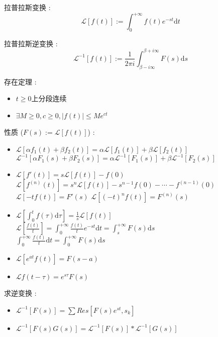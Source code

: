 \documentclass[UTF8, 12pt]{ctexart}
\begin{document}
	
	拉普拉斯变换 : \[ \mathscr{L}[f(t)] := \int_{0}^{+\infty}f(t)e^{-st}\mathrm{d}t \]	

	拉普拉斯逆变换 : \[ \mathscr{L}^{-1}[f(t)] := \frac{1}{2\pi i}\int_{\beta-i\infty}^{\beta+i\infty}F(s)\mathrm{d}s \]

	存在定理 : 
	\begin{itemize}[leftmargin = 4em]
		\item $ t \geq 0 $上分段连续
		\item $ \exists M \geq 0, c \geq 0, |f(t)| \leq Me^{ct} $
	\end{itemize}

	性质 ($ F(s) := \mathscr{L}[f(t)] $) : 
	\begin{itemize}[leftmargin = 4em]
		\item $ \mathscr{L}[\alpha f_1(t) + \beta f_2(t)] = \alpha\mathscr{L}[f_1(t)] + \beta\mathscr{L}[f_2(t)] $ \\
				$ \mathscr{L}^{-1}[\alpha F_1(s) + \beta F_2(s)] = \alpha\mathscr{L}^{-1}[F_1(s)] + \beta\mathscr{L}^{-1}[F_2(s)] $
		\item $ \mathscr{L}[f'(t)] = s\mathscr{L}[f(t)] - f(0) $ \\
				$ \mathscr{L}[f^{(n)}(t)] = s^{n}\mathscr{L}[f(t)] - s^{n-1}f(0) - \cdots - f^{(n-1)}(0) $ \\
				$ \mathscr{L}[-tf(t)] = F'(s) $
				$ \mathscr{L}[(-t)^{n}f(t)] = F^{(n)}(s) $
		\item $ \mathscr{L}[\int_{0}^{t}f(\tau)\mathrm{d}\tau] = \frac{1}{s}\mathscr{L}[f(t)] $ \\
				$ \mathscr{L}[\frac{f(t)}{t}] = \int_0^{+\infty}\frac{f(t)}{t}e^{-st}\mathrm{d}t = \int_{s}^{+\infty}F(s)\mathrm{d}s $ \\
				$ \int_{0}^{+\infty}\frac{f(t)}{t}\mathrm{d}t = \int_{0}^{+\infty}F(s)\mathrm{d}s $
		\item $ \mathscr{L}[e^{at}f(t)] = F(s-a) $
		\item $ \mathscr{L}{f(t-\tau)} = e^{s\tau}F(s) $ 
	\end{itemize}

	求逆变换 :
	\begin{itemize}[leftmargin = 4em]
		\item $ \mathscr{L}^{-1}[F(s)] = \sum Res[F(s)e^{st}, s_k] $
		\item $ \mathscr{L}^{-1}[F(s)G(s)] = \mathscr{L}^{-1}[F(s)] * \mathscr{L}^{-1}[G(s)] $
	\end{itemize}
\end{document}
